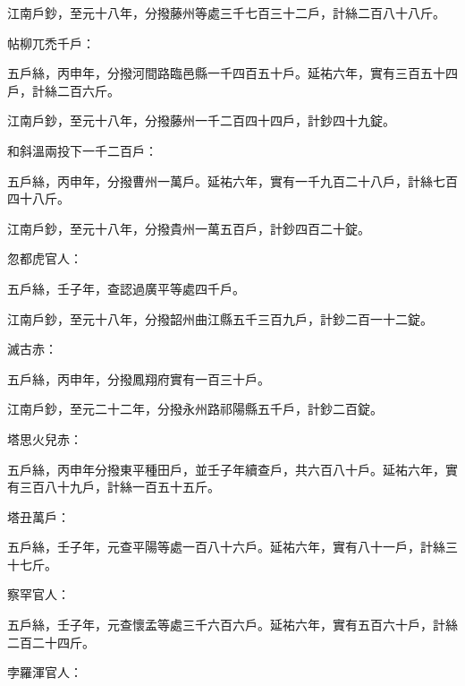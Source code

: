 \begin{pinyinscope}
 江南戶鈔，至元十八年，分撥藤州等處三千七百三十二戶，計絲二百八十八斤。



 帖柳兀禿千戶：



 五戶絲，丙申年，分撥河間路臨邑縣一千四百五十戶。延祐六年，實有三百五十四戶，計絲二百六斤。



 江南戶鈔，至元十八年，分撥藤州一千二百四十四戶，計鈔四十九錠。



 和斜溫兩投下一千二百戶：



 五戶絲，丙申年，分撥曹州一萬戶。延祐六年，實有一千九百二十八戶，計絲七百四十八斤。



 江南戶鈔，至元十八年，分撥貴州一萬五百戶，計鈔四百二十錠。



 忽都虎官人：



 五戶絲，壬子年，查認過廣平等處四千戶。



 江南戶鈔，至元十八年，分撥韶州曲江縣五千三百九戶，計鈔二百一十二錠。



 滅古赤：



 五戶絲，丙申年，分撥鳳翔府實有一百三十戶。



 江南戶鈔，至元二十二年，分撥永州路祁陽縣五千戶，計鈔二百錠。



 塔思火兒赤：



 五戶絲，丙申年分撥東平種田戶，並壬子年續查戶，共六百八十戶。延祐六年，實有三百八十九戶，計絲一百五十五斤。



 塔丑萬戶：



 五戶絲，壬子年，元查平陽等處一百八十六戶。延祐六年，實有八十一戶，計絲三十七斤。



 察罕官人：



 五戶絲，壬子年，元查懷孟等處三千六百六戶。延祐六年，實有五百六十戶，計絲二百二十四斤。



 孛羅渾官人：




\end{pinyinscope}
